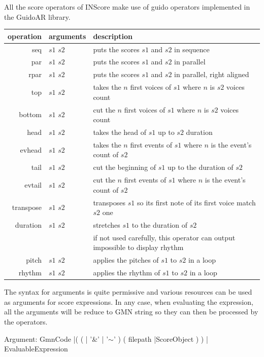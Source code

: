 \label{operators}

All the score operators of INScore make use of guido operators implemented in the GuidoAR library.
\begin{table}[htbp]
\begin{center}
\begin{tabular}{rll}
\hline
operation & arguments		&	description \\
\hline
seq 	&	$s1$ $s2$		& puts the scores $s1$ and $s2$ in sequence \\
par 	&	$s1$ $s2$		& puts the scores $s1$ and $s2$ in parallel \\ 
rpar	&	$s1$ $s2$		& puts the scores $s1$ and $s2$ in parallel, right aligned \\
top 	&	$s1$ $s2$ 		& takes the $n$ first voices of $s1$ where $n$ is $s2$ voices count\\
bottom 	&	$s1$ $s2$ 	& cut the $n$ first voices of $s1$ where $n$ is $s2$ voices count \\
head	& 	$s1$ $s2$	& takes the head of $s1$ up to $s2$ duration \\
evhead 	&	$s1$ $s2$	& takes the $n$ first events of $s1$ where $n$ is the event's count of $s2$ \\
tail	&	$s1$ $s2$ 	& cut the beginning of $s1$ up to the duration of $s2$ \\
evtail 	&	$s1$ $s2$ 	& cut the $n$ first events of $s1$ where $n$ is the event's count of $s2$ \\
transpose 	&	$s1$ $s2$	& transposes $s1$ so its first note of its first voice match $s2$ one \\
duration 	&	$s1$ $s2$	& stretches $s1$ to the duration of $s2$  \\
			& 	& if not used carefully, this operator can output impossible to display rhythm\\
pitch 	&	$s1$ $s2$	& applies the pitches of $s1$ to $s2$ in a loop \\
rhythm 	&	$s1$ $s2$	& applies the rhythm of $s1$ to $s2$ in a loop \\
\hline
\end{tabular}
\end{center}

\end{table}

\label{arguments}

The syntax for arguments is quite permissive and various resources can be used as arguments for score expressions. In any case, when evaluating the expression, all the arguments will be reduce to GMN string so they can then be processed by the operators.
\begin{rail}
Argument: 	 GmnCode
			|(	
				( | '\&' | '$\sim$' )
				(		
					 filepath
					|ScoreObject
				)
			 )
			| 	EvaluableExpression
\end{rail}

